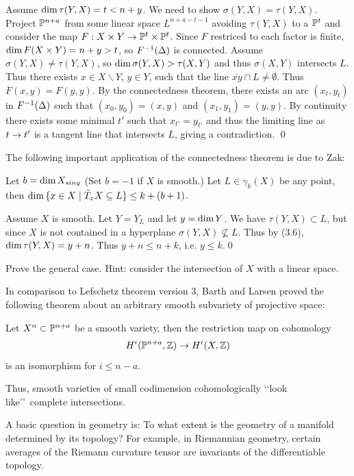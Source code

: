 Assume $\text{dim}\,\tau (Y,X)=t< n+y$. We need to show 
$\sigma(Y,X)=\tau (Y,X)$.
Project $\Bbb P^{n+a}$ 
from some linear space $L^{n+a-t-1}$ avoiding 
$\tau (Y,X)$ to a $\Bbb P^{t}$ and
consider the map $F:  X\times Y\rightarrow \Bbb P^{t}\times \Bbb P^{t}$. Since
$F$ restriced to each factor is finite,
$\text{dim}\, F(X\times  Y)=n+y>t$, so $F{}^{-1} (\Delta )$ is connected. Assume
 $\sigma(Y,X)\neq\tau (Y,X)$, so
$\text{dim}\, \sigma(Y,X)>\tau (X,Y)$ 
and thus $\sigma (X,Y)$ 
 intersects $L$. 
Thus there exists $x\in X\backslash Y$, $y\in Y$, such that
the line $\overline{xy}\cap L\neq \emptyset$. Thus $F(x,y)=F(y,y)$.
By the connectedness theorem, there exists an arc 
 $(x_t,y_t)$ in $F{}^{-1} (\Delta)$ such that 
$(x_0,y_0)=(x,y)$ and $(x_1,y_1)=(y,y)$. By continuity there exists
some minimal $t'$ such that $x_{t'}=y_{t'}$ and thus the limiting
line
as $t\rightarrow t'$ is a tangent line that intersects $L$, giving a contradiction.
\qed\enddemo
\smallpagebreak

 The following important application of the connectedness theorem is due
to Zak: 

 Let $b=\text{dim}\, X_{sing}$
(Set
$b=-1$ if
$X$ is smooth.) Let $L\in \gamma_k(X)$ be any point, then
$\text{dim}\, \{
x\in X\mid \tilde T_xX\subseteq L\}
\leq k+ (b+1)$.
 \endproclaim

 
 Assume $X$ is smooth. Let $Y=Y_L$ and let $y=\text{dim}\, Y$.
We have $\tau (Y,X)\subset L$, but since $X$ is not contained in
a hyperplane $\sigma (Y,X)\not\subseteq L$. Thus by (3.6), $\text{dim}\,\tau(Y,X)=
y+n$. Thus $y+n\leq n+k$, i.e. $y\leq k$.\qed\enddemo

 Prove the general case. Hint: consider
the intersection of $X$ with a linear space.

\smallpagebreak

In comparison to   Lefschetz theorem version 3, Barth and Larsen
proved the following theorem about an arbitrary smooth subvariety
of projective space:

 Let
$X^n\subset\Bbb P^{n+a}$ be a smooth variety, then the restriction map on
cohomology
$$
H^i(\Bbb P^{n+a} ,\Bbb Z)\rightarrow H^i(X, \Bbb Z)
$$
is an isomorphism for $i\leq n-a$.
\endproclaim

Thus, smooth varieties of small codimension cohomologically \lq\lq look
like\rq\rq\ complete intersections. 



A basic question in geometry is: To what extent is the geometry of 
a manifold   determined by its topology? For example, in Riemannian
geometry,   certain averages
of the Riemann curvature tensor are invariants of the differentiable
topology.


